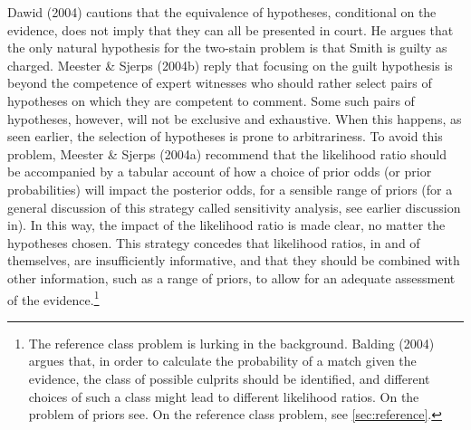 \documentclass[10pt,dvipsnames,enabledeprecatedfontcommands]{scrartcl}
\begin{document}
Dawid (2004) cautions that the equivalence of hypotheses, conditional on
the evidence, does not imply that they can all be presented in court. He
argues that the only natural hypothesis for the two-stain problem is
that Smith is guilty as charged. Meester \& Sjerps (2004b) reply that
focusing on the guilt hypothesis is beyond the competence of expert
witnesses who should rather select pairs of hypotheses on which they are
competent to comment. Some such pairs of hypotheses, however, will not
be exclusive and exhaustive. When this happens, as seen earlier, the
selection of hypotheses is prone to arbitrariness. To avoid this
problem, Meester \& Sjerps (2004a) recommend that the likelihood ratio
should be accompanied by a tabular account of how a choice of prior odds
(or prior probabilities) will impact the posterior odds, for a sensible
range of priors (for a general discussion of this strategy called
sensitivity analysis, see earlier discussion in). In this
way, the impact of the likelihood ratio is made clear, no matter the
hypotheses chosen. This strategy concedes that likelihood ratios, in and
of themselves, are insufficiently informative, and that they should be
combined with other information, such as a range of priors, to allow for
an adequate assessment of the evidence.\footnote{The
  reference class problem is lurking in the background. Balding (2004)
  argues that, in order to calculate the probability of a match given
  the evidence, the class of possible culprits should be identified, and
  different choices of such a class might lead to different likelihood
  ratios. On the problem of priors see. On the reference class problem,
  see \ref{sec:reference}.}
\end{document}
